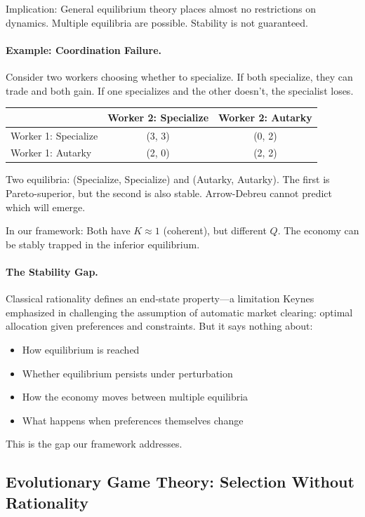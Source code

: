 Implication: General equilibrium theory places almost no restrictions on dynamics.
Multiple equilibria are possible. Stability is not guaranteed.

\paragraph{Example: Coordination Failure.}
Consider two workers choosing whether to specialize.
If both specialize, they can trade and both gain.
If one specializes and the other doesn't, the specialist loses.

\begin{center}
\renewcommand{\arraystretch}{1.2}
\begin{tabular}{l|cc}
 & Worker 2: Specialize & Worker 2: Autarky \\
\hline
Worker 1: Specialize & (3, 3) & (0, 2) \\
Worker 1: Autarky & (2, 0) & (2, 2) \\
\end{tabular}
\end{center}

Two equilibria: (Specialize, Specialize) and (Autarky, Autarky).
The first is Pareto-superior, but the second is also stable.
Arrow-Debreu cannot predict which will emerge.

In our framework: Both have $K \approx 1$ (coherent), but different $Q$.
The economy can be stably trapped in the inferior equilibrium.

\paragraph{The Stability Gap.}
Classical rationality defines an end-state property---a limitation Keynes \citep{keynes1936} emphasized in challenging the assumption of automatic market clearing:
optimal allocation given preferences and constraints.
But it says nothing about:
\begin{itemize}
  \item How equilibrium is reached
  \item Whether equilibrium persists under perturbation
  \item How the economy moves between multiple equilibria
  \item What happens when preferences themselves change
\end{itemize}

This is the gap our framework addresses.

\subsection{Evolutionary Game Theory: Selection Without Rationality}

